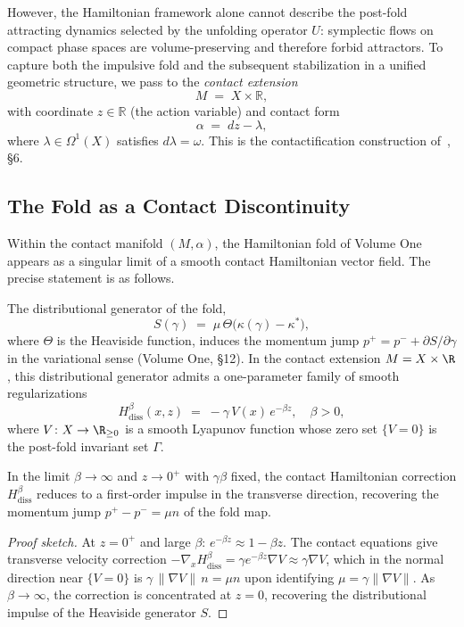 However, the Hamiltonian framework alone cannot describe the
post-fold attracting dynamics selected by the unfolding operator
$U$: symplectic flows on compact phase spaces are volume-preserving
and therefore forbid attractors. To capture both the impulsive
fold and the subsequent stabilization in a unified geometric
structure, we pass to the \emph{contact extension}
\[
  M \;=\; X \times \mathbb{R},
\]
with coordinate $z\in\mathbb{R}$ (the action variable) and
contact form
\[
  \alpha \;=\; dz - \lambda,
\]
where $\lambda\in\Omega^1(X)$ satisfies $d\lambda=\omega$. This
is the contactification construction of~\cite{Paper1}, \S6.

\subsection{The Fold as a Contact Discontinuity}
\label{subsec:contact-fold}

Within the contact manifold $(M,\alpha)$, the Hamiltonian fold
of Volume One appears as a singular limit of a smooth contact
Hamiltonian vector field. The precise statement is as follows.

The distributional generator of the fold,
\[
  S(\gamma) \;=\; \mu\,\Theta\!\bigl(\kappa(\gamma)-\kappa^*\bigr),
\]
where $\Theta$ is the Heaviside function, induces the momentum
jump $p^+=p^-+\partial S/\partial\gamma$ in the variational
sense (Volume One, \S12). In the contact extension $M=X\times\R$,
this distributional generator admits a one-parameter family of
smooth regularizations
\[
  H_{\mathrm{diss}}^\beta(x,z)
  \;=\; -\gamma\,V(x)\,e^{-\beta z}, \quad \beta>0,
\]
where $V\colon X\to\R_{\ge 0}$ is a smooth Lyapunov function
whose zero set $\{V=0\}$ is the post-fold invariant set $\Gamma$.

\begin{proposition}
\label{prop:regularization}
In the limit $\beta\to\infty$ and $z\to 0^+$ with $\gamma\beta$
fixed, the contact Hamiltonian correction $H_{\mathrm{diss}}^\beta$
reduces to a first-order impulse in the transverse direction,
recovering the momentum jump $p^+-p^-=\mu n$ of the fold map.
\end{proposition}

\begin{proof}[Proof sketch]
At $z=0^+$ and large $\beta$: $e^{-\beta z}\approx 1-\beta z$.
The contact equations give transverse velocity correction
$-\nabla_x H_{\mathrm{diss}}^\beta = \gamma e^{-\beta z}\nabla V
\approx \gamma\nabla V$, which in the normal direction near
$\{V=0\}$ is $\gamma\,\|\nabla V\|\,n = \mu n$ upon identifying
$\mu = \gamma\|\nabla V\|$. As $\beta\to\infty$, the correction
is concentrated at $z=0$, recovering the distributional impulse
of the Heaviside generator $S$.
\end{proof}

